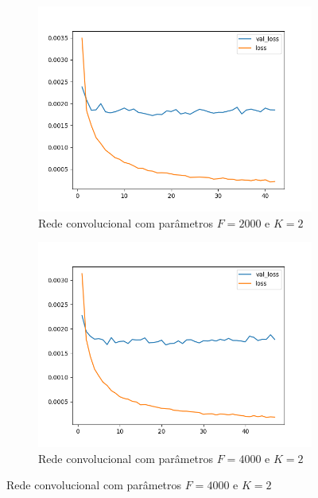 \begin{figure}[H]
\begin{subfigure}{.5\textwidth}
  \label{fig:cnn-1000-k-2-v2}
\end{subfigure}
\begin{subfigure}{.5\textwidth}
  \centering
  \caption{Rede convolucional com parâmetros $F = 2000$ e $K = 2$}
  \includegraphics[width=.8\linewidth]{figuras/ape-ajustes-hiper-parametros/cnn-2000-k-2.png}
  
  \label{fig:cnn-2000-k-2-v2}
\end{subfigure}
\begin{subfigure}{.5\textwidth}
  \centering
  \caption{Rede convolucional com parâmetros $F = 4000$ e $K = 2$}
  \includegraphics[width=.8\linewidth]{figuras/ape-ajustes-hiper-parametros/cnn-4000-k-2.png}
  
  \label{fig:cnn-4000-k-2-v2}
\end{subfigure}
\label{fig:treinamento-cnn-diferentes-kernels}
\end{figure}

